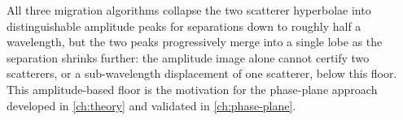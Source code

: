 All three migration algorithms collapse the two scatterer hyperbolae into
distinguishable amplitude peaks for separations down to roughly half a
wavelength, but the two peaks progressively merge into a single lobe as the
separation shrinks further: the amplitude image alone cannot certify two
scatterers, or a sub-wavelength displacement of one scatterer, below this
floor.  This amplitude-based floor is the motivation for the
phase-plane approach developed in \cref{ch:theory} and validated in
\cref{ch:phase-plane}.
